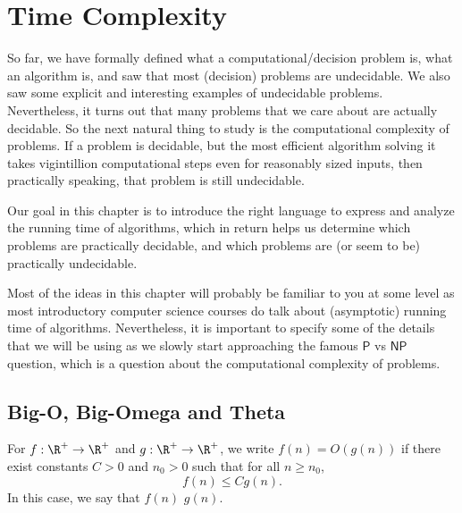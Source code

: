 

\chapter{Time Complexity}
\label{chapter:time-complexity}

\begin{preamble}
So far, we have formally defined what a computational/decision problem is, what an algorithm is, and saw that most (decision) problems are undecidable. We also saw some explicit and interesting examples of undecidable problems. Nevertheless, it turns out that many problems that we care about are actually decidable. So the next natural thing to study is the computational complexity of problems. If a problem is decidable, but the most efficient algorithm solving it takes vigintillion computational steps even for reasonably sized inputs, then practically speaking, that problem is still undecidable.

Our goal in this chapter is to introduce the right language to express and analyze the running time of algorithms, which in return helps us determine which problems are practically decidable, and which problems are (or seem to be) practically undecidable.

Most of the ideas in this chapter will probably be familiar to you at some level as most introductory computer science courses do talk about (asymptotic) running time of algorithms. Nevertheless, it is important to specify some of the details that we will be using as we slowly start approaching the famous $\mathsf{P}$ vs $\mathsf{NP}$ question, which is a question about the computational complexity of problems.
\end{preamble}



\section{Big-O, Big-Omega and Theta}


\begin{definition}[Big-O] \label{definition:Big-O}
For $f: \R^+ \to \R^+$ and $g: \R^+ \to \R^+$, we write $f(n) = O(g(n))$ if there exist constants $C > 0$ and $n_0 > 0$ such that for all $n \geq n_0$,
\[
f(n) \leq Cg(n).
\]
In this case, we say that $f(n)$  $g(n)$.
\end{definition}


